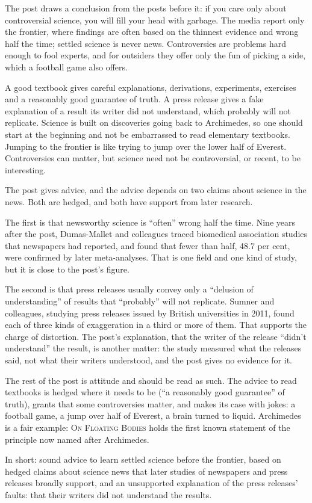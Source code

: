 \begin{afterword}
\summaryhead

The post draws a conclusion from the posts before it: if you care only about controversial science, you will fill your head with garbage. The media report only the frontier, where findings are often based on the thinnest evidence and wrong half the time; settled science is never news. Controversies are problems hard enough to fool experts, and for outsiders they offer only the fun of picking a side, which a football game also offers.

A good textbook gives careful explanations, derivations, experiments, exercises and a reasonably good guarantee of truth. A press release gives a fake explanation of a result its writer did not understand, which probably will not replicate. Science is built on discoveries going back to Archimedes, so one should start at the beginning and not be embarrassed to read elementary textbooks. Jumping to the frontier is like trying to jump over the lower half of Everest. Controversies can matter, but science need not be controversial, or recent, to be interesting.

\responsehead

The post gives advice, and the advice depends on two claims about science in the news. Both are hedged, and both have support from later research.

The first is that newsworthy science is ``often'' wrong half the time. Nine years after the post, Dumas-Mallet and colleagues traced biomedical association studies that newspapers had reported, and found that fewer than half, 48.7 per cent, were confirmed by later meta-analyses. That is one field and one kind of study, but it is close to the post's figure.

The second is that press releases usually convey only a ``delusion of understanding'' of results that ``probably'' will not replicate. Sumner and colleagues, studying press releases issued by British universities in 2011, found each of three kinds of exaggeration in a third or more of them. That supports the charge of distortion. The post's explanation, that the writer of the release ``didn't understand'' the result, is another matter: the study measured what the releases said, not what their writers understood, and the post gives no evidence for it.

The rest of the post is attitude and should be read as such. The advice to read textbooks is hedged where it needs to be (``a reasonably good guarantee'' of truth), grants that some controversies matter, and makes its case with jokes: a football game, a jump over half of Everest, a brain turned to liquid. Archimedes is a fair example: \textsc{On Floating Bodies} holds the first known statement of the principle now named after Archimedes.

In short: sound advice to learn settled science before the frontier, based on hedged claims about science news that later studies of newspapers and press releases broadly support, and an unsupported explanation of the press releases' faults: that their writers did not understand the results.
\end{afterword}
